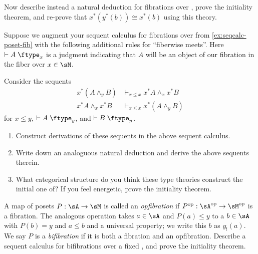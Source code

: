 \documentclass{book}
\let\types\vdash
\def\type{\;\ftype}
\let\meet\wedge
\begin{document}
\begin{ex}\label{ex:natded-poset-fib}
  Now describe instead a natural deduction for fibrations over \sM, prove the initiality theorem, and re-prove that $x^*(y^*(b))\cong x^*(b)$ using this theory.
\end{ex}

\begin{ex}\label{ex:mslat-fib}
  Suppose we augment your sequent calculus for fibrations over \sM from \cref{ex:seqcalc-poset-fib} with the following additional rules for ``fiberwise meets''.
  Here $\types A\type_x$ is a judgment indicating that $A$ will be an object of our fibration in the fiber over $x\in\sM$.
  Consider the sequents
  \begin{align*}
    x^*(A\meet_y B) &\types_{x\le x} x^*A \meet_x x^*B\\
    x^*A \meet_x x^*B &\types_{x\le x} x^*(A\meet_y B)
  \end{align*}
  for $x\le y$, $\types A\type_y$, and $\types B\type_y$.
  \begin{enumerate}
  \item Construct derivations of these sequents in the above sequent calculus.
  \item Write down an analoguous natural deduction and derive the above sequents therein.
  \item What categorical structure do you think these type theories construct the initial one of?
    If you feel energetic, prove the initiality theorem.
  \end{enumerate}
\end{ex}

\begin{ex}\label{ex:poset-bifib}
  A map of posets $P:\sA\to\sM$ is called an \emph{opfibration} if $P\op:\sA\op\to\sM\op$ is a fibration.
  The analogous operation takes $a\in \sA$ and $P(a)\le y$ to a $b\in \sA$ with $P(b)=y$ and $a\le b$ and a universal property; we write this $b$ as $y_!(a)$.
  We say $P$ is a \emph{bifibration} if it is both a fibration and an opfibration.
  Describe a sequent calculus for bifibrations over a fixed \sM, and prove the initiality theorem.
\end{ex}
\end{document}
